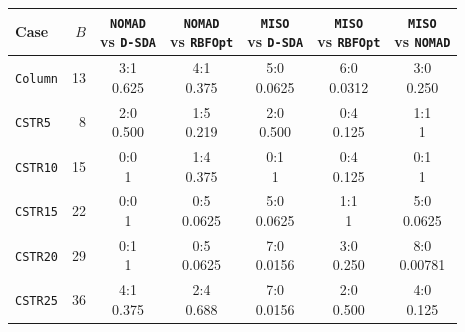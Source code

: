 \begin{tabular}{@{}lrccccc@{}}\toprule
Case & \(B\) & \makecell{\texttt{NOMAD}\\vs \texttt{D-SDA}} & \makecell{\texttt{NOMAD}\\vs \texttt{RBFOpt}} & \makecell{\texttt{MISO}\\vs \texttt{D-SDA}} & \makecell{\texttt{MISO}\\vs \texttt{RBFOpt}} & \makecell{\texttt{MISO}\\vs \texttt{NOMAD}}\\\midrule
\texttt{Column} & 13 & \makecell{3:1\\0.625} & \makecell{4:1\\0.375} & \makecell{5:0\\0.0625} & \makecell{6:0\\0.0312} & \makecell{3:0\\0.250} \\
\texttt{CSTR5} & 8 & \makecell{2:0\\0.500} & \makecell{1:5\\0.219} & \makecell{2:0\\0.500} & \makecell{0:4\\0.125} & \makecell{1:1\\1} \\
\texttt{CSTR10} & 15 & \makecell{0:0\\1} & \makecell{1:4\\0.375} & \makecell{0:1\\1} & \makecell{0:4\\0.125} & \makecell{0:1\\1} \\
\texttt{CSTR15} & 22 & \makecell{0:0\\1} & \makecell{0:5\\0.0625} & \makecell{5:0\\0.0625} & \makecell{1:1\\1} & \makecell{5:0\\0.0625} \\
\texttt{CSTR20} & 29 & \makecell{0:1\\1} & \makecell{0:5\\0.0625} & \makecell{7:0\\0.0156} & \makecell{3:0\\0.250} & \makecell{8:0\\0.00781} \\
\texttt{CSTR25} & 36 & \makecell{4:1\\0.375} & \makecell{2:4\\0.688} & \makecell{7:0\\0.0156} & \makecell{2:0\\0.500} & \makecell{4:0\\0.125} \\

\end{tabular}
